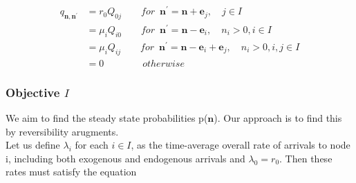 \documentclass[a4paper,12pt]{scrartcl}
\begin{document}
\begin{align}
q_{\textbf{n},\textbf{n}^{\prime}}&=r_0Q_{0j}\quad\quad for\enspace\textbf{n}^{\prime} = \textbf{n} + \textbf{e}_j,\quad j\in I\\
&=\mu_iQ_{i0} \quad\quad for\enspace\textbf{n}^{\prime} = \textbf{n} - \textbf{e}_i,\quad n_i > 0, i \in I\\
&=\mu_iQ_{ij} \quad\quad for\enspace\textbf{n}^{\prime} = \textbf{n} - \textbf{e}_i + \textbf{e}_j,\quad n_i > 0, i,j \in I\\
&= 0 \quad\quad\quad\quad otherwise
\end{align}

\subsubsection*{Objective $\mathit{I}$}
We aim to find the steady state probabilities p($\textbf{n}$).  Our approach is to find this by reversibility arugments.\\
Let us define $\lambda_i$ for each $i \in I$, as the time-average overall rate of arrivals to node i, including both exogenous and endogenous arrivals and $\lambda_0 = r_0$. Then these rates must satisfy the equation
\end{document}

